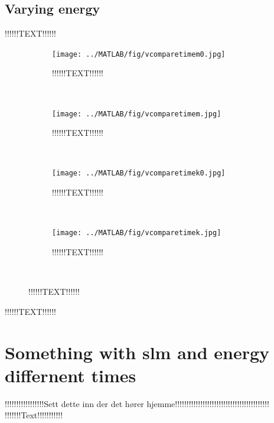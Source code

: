 \subsection{Varying energy}%
!!!!!!TEXT!!!!!! \\
\begin{figure}[H]
        \centering
        \begin{subfigure}[b]{0.3\textwidth}
                \texttt{[image: ../MATLAB/fig/vcomparetimem0.jpg]}
                \caption{ !!!!!!TEXT!!!!!! }
                \label{fig:vcomparetimem0}
        \end{subfigure}
        ~
        \begin{subfigure}[b]{0.3\textwidth}
                \texttt{[image: ../MATLAB/fig/vcomparetimem.jpg]}
                \caption{ !!!!!!TEXT!!!!!! }
                \label{fig:vcomparetimem}
        \end{subfigure}
        ~

        
        \begin{subfigure}[b]{0.3\textwidth}
                \texttt{[image: ../MATLAB/fig/vcomparetimek0.jpg]}
                \caption{ !!!!!!TEXT!!!!!! }
                \label{fig:vcomparetimek0}
        \end{subfigure}
        ~
        \begin{subfigure}[b]{0.3\textwidth}
                \texttt{[image: ../MATLAB/fig/vcomparetimek.jpg]}
                \caption{ !!!!!!TEXT!!!!!! }
                \label{fig:vcomparetimek}
        \end{subfigure}
        ~

        \caption{ !!!!!!TEXT!!!!!!}
        \label{fig:vcomparetime}
\end{figure}
!!!!!!TEXT!!!!!! \\

\section{Something with slm and energy differnent times}%
!!!!!!!!!!!!!!!!!Sett dette inn der det hører hjemme!!!!!!!!!!!!!!!!!!!!!!!!!!!!!!!!!!!!!!!!!\\
!!!!!!!Text!!!!!!!!!!!\\

